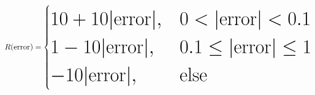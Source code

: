\documentclass{standalone}
\begin{document}
\boldmath
\bfseries
\[
\Huge
R(\mathrm{error}) =
\begin{cases}
10 + 10|\mathrm{error}|, & 0 < |\mathrm{error}| < 0.1 \\
1 - 10|\mathrm{error}|, & 0.1 \leq |\mathrm{error}| \leq 1 \\
-10|\mathrm{error}|, & \text{else}
\end{cases}
\]
\end{document}
